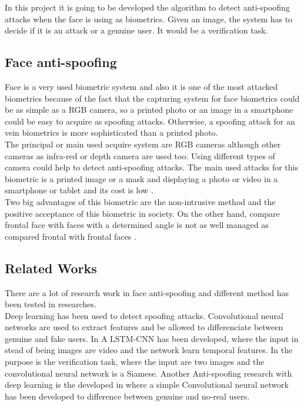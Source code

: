 In this project it is going to be developed the algorithm to detect anti-spoofing attacks when the face is using as biometrics. Given an image, the system has to decide if it is an attack or a genuine user. It would be a verification task.\\

\subsection{Face anti-spoofing}
Face is a very used biometric system and also it is one of the most attacked biometrics because of the fact that the capturing system for face biometrics could be as simple as a RGB camera, so a printed photo or an image in a smartphone could be easy to acquire as spoofing attacks. Otherwise, a spoofing attack for an vein biometrics is more sophisticated than a printed photo.\\

The principal or main used acquire system are RGB cameras although other cameras as infra-red  or depth camera are used too. Using different types of camera could help to detect anti-spoofing attacks. The main used attacks for this biometric is a printed image or a mask and displaying a photo or video in a smartphone or tablet and its cost is low \cite{distorsion}.\\

Two big advantages of this biometric are the non-intrusive method and the positive acceptance of this biometric in society. On the other hand, compare frontal face with faces with a determined angle is not as well managed as compared frontal with frontal faces \cite{survey2}.\\

\subsection{Related Works}
There are a lot of research work in face anti-spoofing and different method has been tested in researches.\\

Deep learning has been used to detect spoofing attacks. Convolutional neural networks are used to extract features and be allowed to differenciate between genuine and fake users. In \cite{LSTM-CNN} A LSTM-CNN has been developed, where the input in stead of being images are video and the network learn temporal features. In \cite{Verification} the purpose is the verification task, where the input are two images and the convolutional neural network is a Siamese. Another Anti-spoofing research with deep learning is the developed in \cite{yangLL14} where a simple Convolutional neural network has been developed to difference between genuine and no-real users.\\

